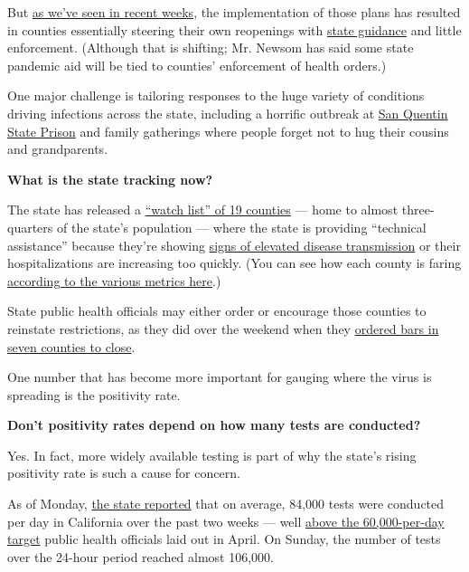 But
\href{https://www.nytimes.com/2020/06/29/us/california-coronavirus-reopening.html?smtyp=cur\&smid=tw-nytnational}{as
we've seen in recent weeks}, the implementation of those plans has
resulted in counties essentially steering their own reopenings with
\href{https://covid19.ca.gov/industry-guidance/\#top}{state guidance}
and little enforcement. (Although that is shifting; Mr. Newsom has said
some state pandemic aid will be tied to counties' enforcement of health
orders.)

One major challenge is tailoring responses to the huge variety of
conditions driving infections across the state, including a horrific
outbreak at
\href{https://www.marinij.com/2020/06/29/marin-asks-newsom-to-intervene-in-san-quentin-outbreak/}{San
Quentin State Prison} and family gatherings where people forget not to
hug their cousins and grandparents.

\textbf{What is the state tracking now?}

The state has released a
\href{https://www.cdph.ca.gov/Programs/CID/DCDC/Pages/COVID-19/CountyMonitoringDataStep2.aspx}{``watch
list'' of 19 counties} --- home to almost three-quarters of the state's
population --- where the state is providing ``technical assistance''
because they're showing
\href{https://www.cdph.ca.gov/Programs/CID/DCDC/Pages/COVID-19/COVID19CountyDataTable.aspx}{signs
of elevated disease transmission} or their hospitalizations are
increasing too quickly. (You can see how each county is faring
\href{https://www.cdph.ca.gov/Programs/CID/DCDC/Pages/COVID-19/COVID19CountyDataTable.aspx}{according
to the various metrics here}.)

State public health officials may either order or encourage those
counties to reinstate restrictions, as they did over the weekend when
they
\href{https://www.cdph.ca.gov/Programs/CID/DCDC/Pages/COVID-19/Bar-Closure-Guidance.aspx}{ordered
bars in seven counties to close}.

One number that has become more important for gauging where the virus is
spreading is the positivity rate.

\textbf{Don't positivity rates depend on how many tests are conducted?}

Yes. In fact, more widely available testing is part of why the state's
rising positivity rate is such a cause for concern.

As of Monday, \href{https://update.covid19.ca.gov/}{the state reported}
that on average, 84,000 tests were conducted per day in California over
the past two weeks --- well
\href{https://www.nytimes.com/2020/04/24/us/coronavirus-covid-get-antibody-testing.html}{above
the 60,000-per-day target} public health officials laid out in April. On
Sunday, the number of tests over the 24-hour period reached almost
106,000.

